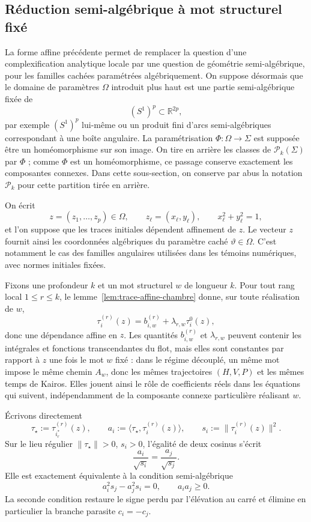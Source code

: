 \documentclass[11pt,a4paper]{article}
\theoremstyle{definition}
\theoremstyle{remark}
\begin{document}
\subsection{Réduction semi-algébrique à mot structurel fixé}

La forme affine précédente permet de remplacer la question d'une complexification analytique locale par une question de géométrie semi-algébrique, pour les familles cachées paramétrées algébriquement. On suppose désormais que le domaine de paramètres $\Omega$ introduit plus haut est une partie semi-algébrique fixée de
\[
 (S^1)^p\subset\mathbb R^{2p},
\]
par exemple $(S^1)^p$ lui-même ou un produit fini d'arcs semi-algébriques correspondant à une boîte angulaire. La paramétrisation $\Phi:\Omega\to\Sigma$ est supposée être un homéomorphisme sur son image. On tire en arrière les classes de $\mathcal P_k(\Sigma)$ par $\Phi$ ; comme $\Phi$ est un homéomorphisme, ce passage conserve exactement les composantes connexes. Dans cette sous-section, on conserve par abus la notation $\mathcal P_k$ pour cette partition tirée en arrière.

On écrit
\[
 z=(z_1,\dots,z_p)\in\Omega,
 \qquad
 z_\ell=(x_\ell,y_\ell),
 \qquad
 x_\ell^2+y_\ell^2=1,
\]
et l'on suppose que les traces initiales dépendent affinement de $z$. Le vecteur $z$ fournit ainsi les coordonnées algébriques du paramètre caché $\vartheta\in\Omega$. C'est notamment le cas des familles angulaires utilisées dans les témoins numériques, avec normes initiales fixées.

Fixons une profondeur $k$ et un mot structurel $w$ de longueur $k$. Pour tout rang local $1\le r\le k$, le lemme~\ref{lem:trace-affine-chambre} donne, sur toute réalisation de $w$,
\[
 \tau_i^{(r)}(z)=b_{i,w}^{(r)}+\lambda_{r,w}\tau_i^0(z),
\]
donc une dépendance affine en $z$. Les quantités $b_{i,w}^{(r)}$ et $\lambda_{r,w}$ peuvent contenir les intégrales et fonctions transcendantes du flot, mais elles sont constantes par rapport à $z$ une fois le mot $w$ fixé : dans le régime découplé, un même mot impose le même chemin $A_w$, donc les mêmes trajectoires $(H,V,P)$ et les mêmes temps de Kairos. Elles jouent ainsi le rôle de coefficients réels dans les équations qui suivent, indépendamment de la composante connexe particulière réalisant $w$.

Écrivons directement
\[
 \tau_\star:=\tau_{i_r^*}^{(r)}(z),
 \qquad
 a_i:=\langle \tau_\star,\tau_i^{(r)}(z)\rangle,
 \qquad
 s_i:=\|\tau_i^{(r)}(z)\|^2.
\]
Sur le lieu régulier $\|\tau_\star\|>0$, $s_i>0$, l'égalité de deux cosinus s'écrit
\[
 \frac{a_i}{\sqrt{s_i}}
 =\frac{a_j}{\sqrt{s_j}}.
\]
Elle est exactement équivalente à la condition semi-algébrique
\[
 \boxed{
 a_i^2s_j-a_j^2s_i=0,
 \qquad
 a_ia_j\ge0.}
\]
La seconde condition restaure le signe perdu par l'élévation au carré et élimine en particulier la branche parasite $c_i=-c_j$.
\end{document}
